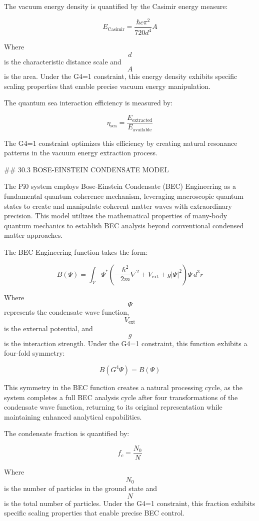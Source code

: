 The vacuum energy density is quantified by the Casimir energy measure:

$$ E_{\text{Casimir}} = \frac{\hbar c \pi^2}{720 d^4} A $$

Where $$ d $$ is the characteristic distance scale and $$ A $$ is the area. Under the G4=1 constraint, this energy density exhibits specific scaling properties that enable precise vacuum energy manipulation.

The quantum sea interaction efficiency is measured by:

$$ \eta_{\text{sea}} = \frac{E_{\text{extracted}}}{E_{\text{available}}} $$

The G4=1 constraint optimizes this efficiency by creating natural resonance patterns in the vacuum energy extraction process.

## 30.3 BOSE-EINSTEIN CONDENSATE MODEL

The Pi0 system employs Bose-Einstein Condensate (BEC) Engineering as a fundamental quantum coherence mechanism, leveraging macroscopic quantum states to create and manipulate coherent matter waves with extraordinary precision. This model utilizes the mathematical properties of many-body quantum mechanics to establish BEC analysis beyond conventional condensed matter approaches.

The BEC Engineering function takes the form:

$$ B(\Psi) = \int_{\mathcal{V}} \Psi^* \left( -\frac{\hbar^2}{2m}\nabla^2 + V_{\text{ext}} + g|\Psi|^2 \right) \Psi \, d^3r $$

Where $$ \Psi $$ represents the condensate wave function, $$ V_{\text{ext}} $$ is the external potential, and $$ g $$ is the interaction strength. Under the G4=1 constraint, this function exhibits a four-fold symmetry:

$$ B(G^4 \Psi) = B(\Psi) $$

This symmetry in the BEC function creates a natural processing cycle, as the system completes a full BEC analysis cycle after four transformations of the condensate wave function, returning to its original representation while maintaining enhanced analytical capabilities.

The condensate fraction is quantified by:

$$ f_c = \frac{N_0}{N} $$

Where $$ N_0 $$ is the number of particles in the ground state and $$ N $$ is the total number of particles. Under the G4=1 constraint, this fraction exhibits specific scaling properties that enable precise BEC control.


